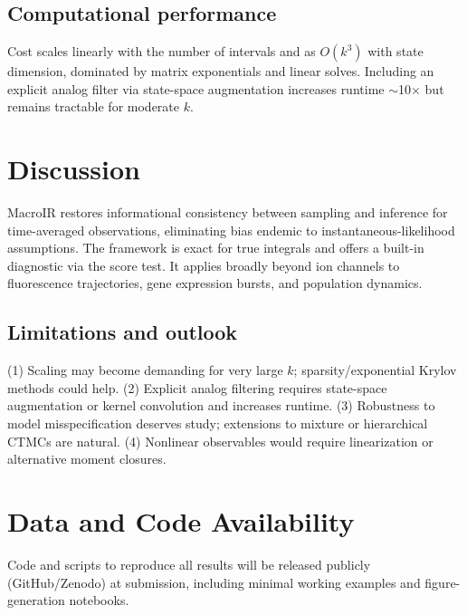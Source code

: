 \documentclass[9pt]{elife}
\begin{document}

\subsection*{Computational performance}
Cost scales linearly with the number of intervals and as $O(k^3)$ with state dimension, dominated by matrix exponentials and linear solves. Including an explicit analog filter via state-space augmentation increases runtime $\sim$10$\times$ but remains tractable for moderate $k$.


\section*{Discussion}
MacroIR restores informational consistency between sampling and inference for time-averaged observations, eliminating bias endemic to instantaneous-likelihood assumptions. The framework is exact for true integrals and offers a built-in diagnostic via the score test. It applies broadly beyond ion channels to fluorescence trajectories, gene expression bursts, and population dynamics.

\subsection*{Limitations and outlook}
(1) Scaling may become demanding for very large $k$; sparsity/exponential Krylov methods could help. (2) Explicit analog filtering requires state-space augmentation or kernel convolution and increases runtime. (3) Robustness to model misspecification deserves study; extensions to mixture or hierarchical CTMCs are natural. (4) Nonlinear observables would require linearization or alternative moment closures.

\section*{Data and Code Availability}
Code and scripts to reproduce all results will be released publicly (GitHub/Zenodo) at submission, including minimal working examples and figure-generation notebooks.
\end{document}
